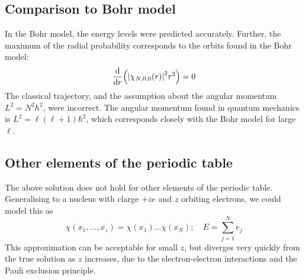 \subsection{Comparison to Bohr model}
In the Bohr model, the energy levels were predicted accurately.
Further, the maximum of the radial probability corresponds to the orbits found in the Bohr model:
\[
	\dv{r} \qty( \abs{\chi_{N,0,0}(r)}^2 r^2) = 0
\]
The classical trajectory, and the assumption about the angular momentum \( L^2 = N^2 \hbar^2 \), were incorrect.
The angular momentum found in quantum mechanics is \( L^2 = \ell(\ell+1) \hbar^2 \), which corresponds closely with the Bohr model for large \( \ell \).

\subsection{Other elements of the periodic table}
The above solution does not hold for other elements of the periodic table.
Generalising to a nucleus with clarge \( +ze \) and \( z \) orbiting electrons, we could model this as
\[
	\chi(x_1, \dots, x_z) = \chi(x_1) \dots \chi(x_N);\quad E = \sum_{j=1}^N e_j
\]
This approximation can be acceptable for small \( z \), but diverges very quickly from the true solution as \( z \) increases, due to the electron-electron interactions and the Pauli exclusion principle.
